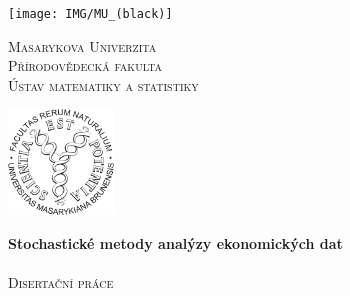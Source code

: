 \documentclass[a4paper,12pt]{report}
\theoremstyle{definition} \newtheorem{definice}[veta]{Definice}
\theoremstyle{remark}
\begin{document}
\titlepage
\setcounter{page}{1}
\hspace{-14mm}
\vspace*{-5mm}
\begin{minipage}{28mm}
  \texttt{[image: IMG/MU\_(black)]}
\end{minipage}\hspace{2mm}
\begin{minipage}{90mm}%
\begin{center}%
\textsc{\LARGE{Masarykova Univerzita}} \\ \vspace{2mm}
\textsc{\Large{Přírodovědecká fakulta}} \\ \vspace{2mm}
\textsc{\large{Ústav matematiky a statistiky}}
\end{center}%
\end{minipage}\hspace{2mm}
\begin{minipage}{28mm}
  \includegraphics[width=28mm]{IMG/sci-logo.pdf}
\end{minipage}
%
%
\vfill
\begin{center}
\textbf{\huge{Stochastické metody analýzy ekonomických dat}} \\ \quad \\  \vspace{2mm}
\textsc{\Large{Disertační práce}}
\end{center} \quad \\\\\\\\\\\\\\\\\\\\\\\\\\ \\
\end{document}
